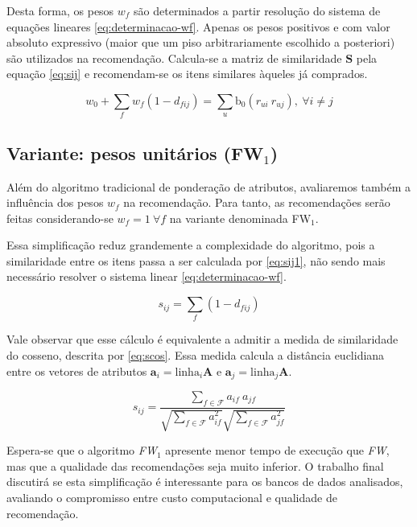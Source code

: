 Desta forma, os pesos $w_f$ são determinados a partir resolução do sistema de equações lineares \ref{eq:determinacao-wf}. Apenas os pesos positivos e com valor absoluto expressivo (maior que um piso arbitrariamente escolhido a posteriori) são utilizados na recomendação. Calcula-se a matriz de similaridade $\mathbf{S}$ pela equação \ref{eq:sij} e recomendam-se os itens similares àqueles já comprados.  

\begin{equation}
\label{eq:determinacao-wf} 
    w_0 + \sum_{f}{w_{f}  \left(1-d_{fij}\right)} = \sum_{u}{\mathrm{b_0}\left(r_{ui} ~ r_{uj}\right)},~\forall i \neq j 
\end{equation} 

\subsection{Variante: pesos unitários (FW$_1$)} %
\label{sub:variante_pesos_unit_rios}

Além do algoritmo tradicional de ponderação de atributos, avaliaremos também a influência dos pesos $w_f$ na recomendação. Para tanto, as recomendações serão feitas considerando-se $w_f = 1~\forall f$ na variante denominada FW$_1$. 

Essa simplificação reduz grandemente a complexidade do algoritmo, pois a similaridade entre os itens passa a ser calculada por \ref{eq:sij1}, não sendo mais necessário  resolver o sistema linear \ref{eq:determinacao-wf}. 

\begin{equation} 
\label{eq:sij1}
    s_{ij} = \sum_{f}{\left(1-d_{fij}\right)}
\end{equation}

Vale observar que esse cálculo é equivalente a admitir a medida de similaridade do cosseno, descrita por \ref{eq:scos}. Essa medida calcula a distância euclidiana entre os vetores de atributos $\mathbf{a}_i = \mathrm{linha}_i \mathbf{A}$ e $\mathbf{a}_j = \mathrm{linha}_j \mathbf{A}$.

\begin{equation} 
\label{eq:scos}
    s_{ij} = \frac{\sum\limits_{f \in \mathcal{F}}{a_{if}~a_{jf}}}{\sqrt{\sum\limits_{f \in \mathcal{F}}a_{if}^2} \sqrt{\sum\limits_{f \in \mathcal{F}}a_{jf}^2}}
\end{equation}

Espera-se que o algoritmo \textit{FW$_1$} apresente menor tempo de execução que \textit{FW}, mas que a qualidade das recomendações seja muito inferior. O trabalho final discutirá se esta simplificação é interessante para os bancos de dados analisados, avaliando o compromisso entre custo computacional e qualidade de recomendação.

